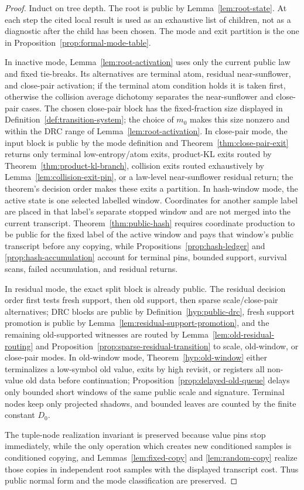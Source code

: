 \documentclass[11pt]{article}
\begin{document}
\begin{proof}
Induct on tree depth.  The root is public by Lemma~\ref{lem:root-state}.  At
each step the cited local result is used as an exhaustive list of children, not
as a diagnostic after the child has been chosen.
The mode and exit partition is the one in Proposition~\ref{prop:formal-mode-table}.

In inactive mode, Lemma~\ref{lem:root-activation} uses only the current public
law and fixed tie-breaks.  Its alternatives are terminal atom, residual
near-sunflower, and close-pair activation; if the terminal atom condition holds
it is taken first, otherwise the collision average dichotomy separates the
near-sunflower and close-pair cases.  The chosen close-pair block has the
fixed-fraction size displayed in Definition~\ref{def:transition-system}; the
choice of $m_0$ makes this size nonzero and within the DRC range of
Lemma~\ref{lem:root-activation}.  In close-pair mode, the input block
is public by the mode definition and Theorem~\ref{thm:close-pair-exit} returns
only terminal low-entropy/atom exits, product-KL exits routed by
Theorem~\ref{thm:product-kl-branch}, collision exits routed
exhaustively by Lemma~\ref{lem:collision-exit-pin}, or a law-level near-sunflower residual
return; the theorem's decision order makes these exits a partition.  In
hash-window mode, the active state is one selected labelled window.  Coordinates
for another sample label are placed in that label's separate stopped window and
are not merged into the current transcript.  Theorem~\ref{thm:public-hash}
requires coordinate production to be public for the fixed label of the active
window and pays that window's public transcript before any copying, while
Propositions~\ref{prop:hash-ledger} and \ref{prop:hash-accumulation} account
for terminal pins, bounded support, survival scans, failed accumulation, and
residual returns.

In residual mode, the exact split block is already public.  The residual
decision order first tests fresh support, then old support, then sparse
scale/close-pair alternatives; DRC blocks are public by
Definition~\ref{hyp:public-drc}, fresh support promotion is public by
Lemma~\ref{lem:residual-support-promotion}, and the remaining old-supported
witnesses are routed by Lemma~\ref{lem:old-residual-routing} and
Proposition~\ref{prop:sparse-residual-transition} to scale, old-window, or
close-pair modes.  In old-window mode, Theorem~\ref{hyp:old-window} either
terminalizes a low-symbol old value, exits by high revisit, or registers all
non-value old data before continuation; Proposition~\ref{prop:delayed-old-queue}
delays only bounded short windows of the same public scale and signature.
Terminal nodes keep only projected shadows, and bounded leaves are counted by
the finite constant $D_0$.

The tuple-node realization invariant is preserved because value pins stop
immediately, while the only operation which creates new conditioned samples is
conditioned copying, and Lemmas~\ref{lem:fixed-copy} and
\ref{lem:random-copy} realize those copies in independent root samples with
the displayed transcript cost.  Thus public normal form and the mode
classification are preserved.
\end{proof}
\end{document}
